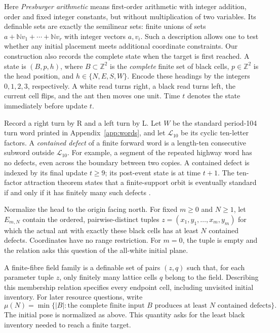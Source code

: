 \documentclass[11pt]{article}
\theoremstyle{remark}\newtheorem{remark}[theorem]{Remark}
\newcommand{\Z}{\mathbb Z}\newcommand{\N}{\mathbb N}
\begin{document}
Here \emph{Presburger arithmetic} means first-order arithmetic with integer
addition, order and fixed integer constants, but without multiplication of
two variables. Its definable sets are exactly the semilinear sets: finite
unions of sets $a+\mathbb N v_1+\cdots+\mathbb N v_r$ with integer vectors
$a,v_i$. Such a description allows one to test whether any initial placement
meets additional coordinate constraints. Our construction also records the
complete state when the target is first reached.
A state is $(B,p,h)$, where $B\subset\Z^2$ is the \emph{complete} finite set of
black cells, $p\in\Z^2$ is the head position, and $h\in\{N,E,S,W\}$.
Encode these headings by the integers $0,1,2,3$, respectively. A white read turns
right, a black read turns left, the current cell flips, and the ant then moves
one unit. Time $t$ denotes the state immediately before update $t$.

Record a right turn by R and a left turn by L. Let $W$ be the standard
period-104 turn word printed in Appendix~\ref{app:words},
and let $\mathcal L_{10}$ be its cyclic ten-letter factors. A \emph{contained
defect} of a finite forward word is a length-ten consecutive subword outside
$\mathcal L_{10}$. For example, a segment of the repeated highway word has
no defects, even across the boundary between two copies. A contained defect
is indexed by its final update $t\ge9$; its post-event state is at time $t+1$.
The ten-factor
attraction theorem states that a finite-support orbit is eventually standard
if and only if it has finitely many such defects \cite{project}.

Normalize the head to the origin facing north. For fixed $m\ge0$ and $N\ge1$,
let $E_{m,N}$ contain the ordered, pairwise-distinct tuples
$z=(x_1,y_1,\ldots,x_m,y_m)$ for which the actual ant with exactly these black
cells has at least $N$ contained defects. Coordinates have no range restriction.
For $m=0$, the tuple is empty and the relation asks this question of the
all-white initial plane.

A finite-fibre field family is a definable set of pairs $(z,q)$ such that,
for each parameter tuple $z$, only finitely many lattice cells $q$ belong to
the field. Describing this membership relation specifies every endpoint cell,
including unvisited initial inventory.
For later resource questions, write
\[
 \mu(N)=\min\{|B|:\text{the complete finite input }B
              \text{ produces at least }N\text{ contained defects}\}.
\]
The initial pose is normalized as above. This quantity asks for the least
black inventory needed to reach a finite target.
\end{document}
